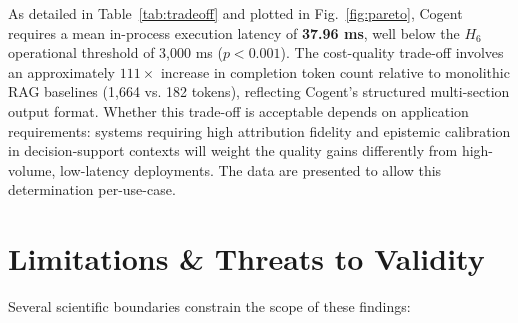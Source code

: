 \documentclass[journal,compsoc]{IEEEtran}
\begin{document}
As detailed in Table~\ref{tab:tradeoff} and plotted in Fig.~\ref{fig:pareto}, Cogent requires a mean in-process execution latency of \textbf{37.96 ms}, well below the $H_6$ operational threshold of 3,000 ms ($p < 0.001$). The cost-quality trade-off involves an approximately $111\times$ increase in completion token count relative to monolithic RAG baselines (1,664 vs. 182 tokens), reflecting Cogent's structured multi-section output format. Whether this trade-off is acceptable depends on application requirements: systems requiring high attribution fidelity and epistemic calibration in decision-support contexts will weight the quality gains differently from high-volume, low-latency deployments. The data are presented to allow this determination per-use-case.

\section{Limitations \& Threats to Validity}
Several scientific boundaries constrain the scope of these findings:
\end{document}

